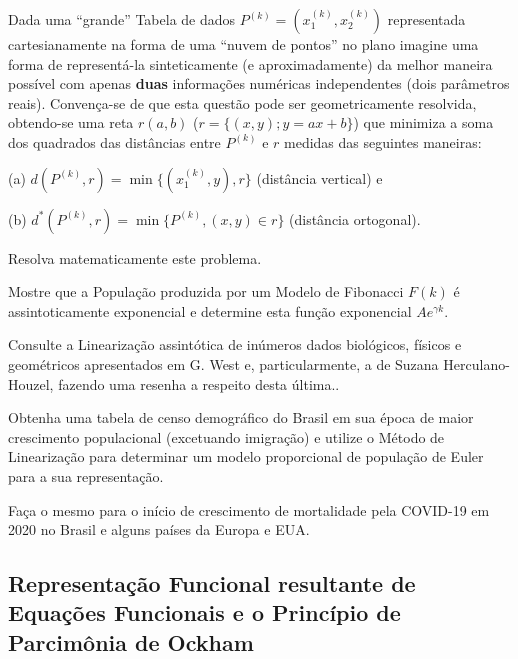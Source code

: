 \begin{exercise}
Dada uma ``grande'' Tabela de dados \(P^{(k)} = (x_{1}^{(k)}, x_{2}^{(k)})\) representada cartesianamente na forma de uma ``nuvem de pontos'' no plano imagine uma forma de representá-la sinteticamente (e aproximadamente) da melhor maneira possível com apenas \textbf{duas} informações numéricas independentes (dois parâmetros reais). Convença-se de que esta questão pode ser geometricamente resolvida, obtendo-se uma reta \(r(a, b)\) (\(r = \{(x, y); y = ax+b\}\)) que minimiza a soma dos quadrados das distâncias entre \(P^{(k)}\) e \(r\) medidas das seguintes maneiras:
\begin{description}
\item (a) \(d(P^{(k)}, r) = \min\{(x_{1}^{(k)}, y), r\}\) (distância vertical) e
\item (b) \(d^\ast(P^{(k)}, r) = \min\{P^{(k)}, (x, y) \in r\}\) (distância ortogonal).
\end{description}

Resolva matematicamente este problema.
\end{exercise}

\begin{exercise}
Mostre que a População produzida por um Modelo de Fibonacci \(F(k)\) é assintoticamente exponencial e determine esta função exponencial \(A e^{\gamma k}\).
\end{exercise}

\begin{exercise}
Consulte a Linearização assintótica de inúmeros dados biológicos, físicos e geométricos apresentados em G. West e, particularmente, a de Suzana Herculano-Houzel, fazendo uma resenha a respeito desta última..
\end{exercise}

\begin{exercise}
Obtenha uma tabela de censo demográfico do Brasil em sua época de maior crescimento populacional (excetuando imigração) e utilize o Método de Linearização para determinar um modelo proporcional de população de Euler para a sua representação.
\end{exercise}

\begin{exercise}
Faça o mesmo para o início de crescimento de mortalidade pela COVID-19 em 2020 no Brasil e alguns países da Europa e EUA.
\end{exercise}


\subsection{Representação Funcional resultante de Equações Funcionais e o Princípio de Parcimônia de Ockham}

